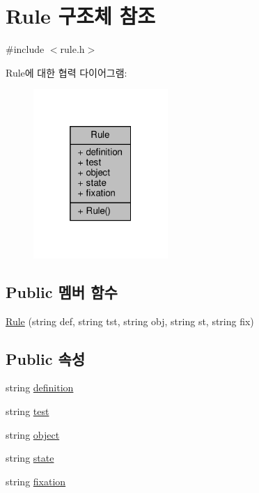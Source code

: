 \hypertarget{struct_rule}{}\section{Rule 구조체 참조}
\label{struct_rule}


{\ttfamily \#include $<$rule.\+h$>$}



Rule에 대한 협력 다이어그램\+:\nopagebreak
\begin{figure}[H]
\begin{center}
\leavevmode
\includegraphics[width=145pt]{struct_rule__coll__graph}
\end{center}
\end{figure}
\subsection*{Public 멤버 함수}
\begin{DoxyCompactItemize}
\item 
\hyperlink{struct_rule_af2cf72df5006e2ce8c5a05666b028683}{Rule} (string def, string tst, string obj, string st, string fix)
\end{DoxyCompactItemize}
\subsection*{Public 속성}
\begin{DoxyCompactItemize}
\item 
string \hyperlink{struct_rule_a747f1497b7ed37f57b7e005bb01e1b3b}{definition}
\item 
string \hyperlink{struct_rule_a44865cab2ebf41957fd79a0ace31078b}{test}
\item 
string \hyperlink{struct_rule_aef723fe24b9b0acd063cb8cf7ba77ba1}{object}
\item 
string \hyperlink{struct_rule_a565f287f7b2370aca4f019d143227c5f}{state}
\item 
string \hyperlink{struct_rule_a580d700e40dd7c70ab0eea2a75335fb7}{fixation}
\end{DoxyCompactItemize}


